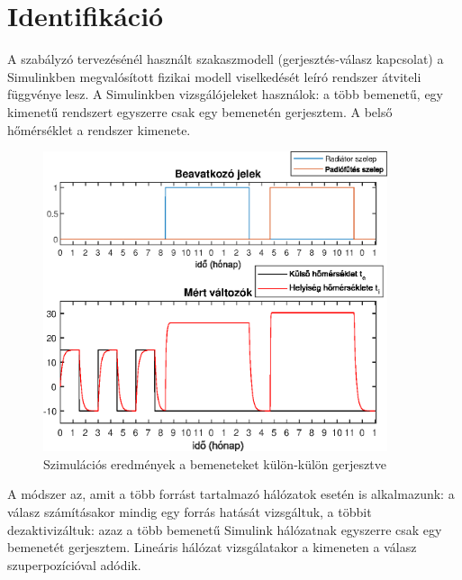 \chapter{Identifikáció}\label{chap:ident}


A szabályzó tervezésénél használt szakaszmodell (gerjesztés-válasz kapcsolat) a Simulinkben megvalósított fizikai modell viselkedését leíró rendszer átviteli függvénye lesz. A Simulinkben vizsgálójeleket használok: a több bemenetű, egy kimenetű rendszert egyszerre csak egy bemenetén gerjesztem. A belső hőmérséklet a rendszer kimenete. %

\begin{figure}[H]
	\centering
	\includegraphics[trim=0 0 0 0, clip,width=0.9\textwidth]{figures/valve-step}
	\caption{Szimulációs eredmények a bemeneteket külön-külön gerjesztve}
	\label{fig:valve-step}
\end{figure}

A módszer az, amit a több forrást tartalmazó hálózatok esetén is alkalmazunk: a válasz számításakor mindig egy forrás hatását vizsgáltuk, a többit dezaktivizáltuk: azaz a több bemenetű Simulink hálózatnak egyszerre csak egy bemenetét gerjesztem. Lineáris hálózat vizsgálatakor a kimeneten a válasz szuperpozícióval adódik. 

